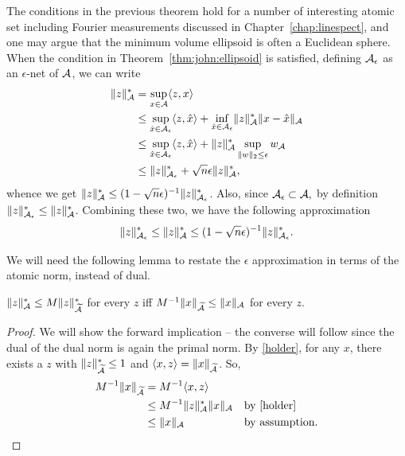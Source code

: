 The conditions in the previous theorem hold for a number of interesting atomic
set including Fourier measurements discussed in Chapter~\ref{chap:linespect},
and one may argue that the minimum volume ellipsoid is often a Euclidean sphere.
When the condition in Theorem~\ref{thm:john:ellipsoid} is satisfied, defining
$\mathcal{A}_\epsilon$ as an $\epsilon$-net of $\mathcal{A}$, we can write
\begin{align*}
	\lVert z\rVert_{\mathcal{A}}^* &= \sup_{x \in \mathcal{A}} \langle z, x\rangle\\
	&\leq \sup_{\hat{x} \in \mathcal{A}_\epsilon} \langle z, \hat{x}\rangle + \inf_{\hat{x} \in \mathcal{A}_\epsilon} \lVert z\rVert_{\mathcal{A}}^* \lVert x - \hat{x}\rVert_{\mathcal{A}}\\
	&\leq \sup_{\hat{x} \in \mathcal{A}_\epsilon} \langle z, \hat{x}\rangle +  \lVert z\rVert_{\mathcal{A}}^* \sup_{\lVert w\rVert_2 \leq \epsilon}{w}_{\mathcal{A}}\\
	&\leq \lVert z\rVert_{\mathcal{A}_\epsilon}^* +  \sqrt{n}\epsilon\lVert z\rVert_{\mathcal{A}}^*,
\end{align*}
whence we get $\lVert z\rVert_{\mathcal{A}}^* \leq
(1-\sqrt{n}\epsilon)^{-1}\lVert z\rVert_{\mathcal{A}_\epsilon}^*$. Also, since $\mathcal{A}_\epsilon
\subset \mathcal{A},$ by definition $\lVert z\rVert_{\mathcal{A}_\epsilon}^* \leq \lVert z\rVert_{\mathcal{A}}^*$.
Combining these two, we have the following approximation
\begin{equation}
\label{eq:enet-approx-dual}	
\lVert z\rVert_{\mathcal{A}_\epsilon}^* \leq \lVert z\rVert_{\mathcal{A}}^* \leq (1-\sqrt{n}\epsilon)^{-1}\lVert z\rVert_{\mathcal{A}_\epsilon}^*.
\end{equation}

We will need the following lemma to restate the $\epsilon$ approximation in
terms of the atomic norm, instead of dual.

\begin{lemma}
${\lVert z\rVert_{\mathcal{A}}^* \leq M\lVert z\rVert_{\widetilde{\mathcal{A}}}^*}$ for every $z$ iff
${M^{-1}\lVert x\rVert_{\widetilde{\mathcal{A}}} \leq \lVert x\rVert_{\mathcal{A}}}$ for every $z$.
\end{lemma}
\begin{proof}\belowdisplayskip=-12pt
We will show the forward implication -- the converse will follow since the dual
of the dual norm is again the primal norm. By \eqref{holder}, for any $x$, 
there exists a $z$ with
$\lVert z\rVert_{\widetilde{\mathcal{A}}}^* \leq 1$ and ${\langle x, z\rangle =
\lVert x\rVert_{\widetilde{\mathcal{A}}}}$. So,
\begin{align*}
M^{-1}\lVert x\rVert_{\widetilde{\mathcal{A}}} &= M^{-1}\langle x, z\rangle &&\\
&\leq M^{-1}\lVert z\rVert_{\mathcal{A}}^* \lVert x\rVert_{\mathcal{A}} &&\text{by \eqref{holder}}\\
&\leq \lVert x\rVert_{\mathcal{A}} &&\text{by assumption.}
\end{align*}
\end{proof}

